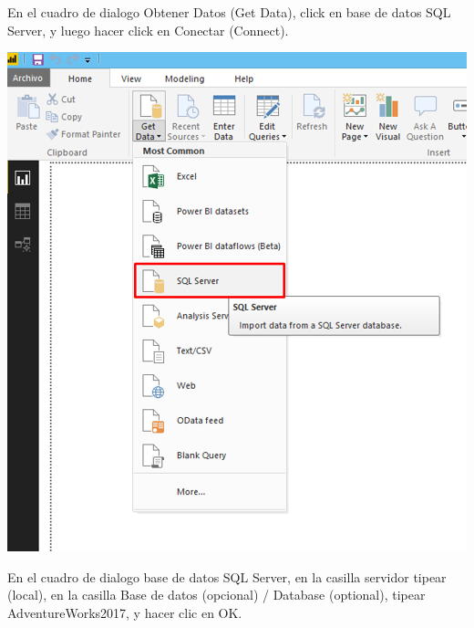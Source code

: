 \documentclass[12pt,letterpaper]{article}
\begin{document}
En el cuadro de dialogo Obtener Datos (Get Data), click en base de datos SQL Server, y luego hacer click en
Conectar (Connect).
\begin{center}
    \includegraphics[width=16cm]{img/3.png}  
\end{center}
En el cuadro de dialogo base de datos SQL Server, en la casilla servidor tipear (local), en la casilla Base de
datos (opcional) / Database (optional), tipear AdventureWorks2017, y hacer clic en OK.
\end{document}
